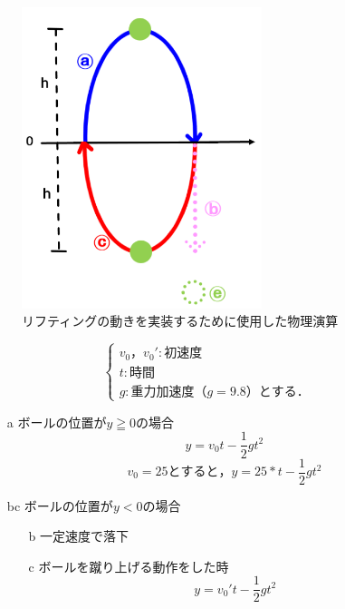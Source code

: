 \begin{figure}[htbp]
    \centering
    \includegraphics[width=7cm]{image/butsuri.png}
    \caption{リフティングの動きを実装するために使用した物理演算}
  \label{butsuri}
\end{figure}



\[
    \begin{cases}
        v_0，v_0': 初速度 & \\
        t: 時間 & \\
        g: 重力加速度（g=9.8）とする． &
    \end{cases}
\]

\vspace{1cm}

\begin{itemize}
    \item[a] ボールの位置が$y \geqq 0$の場合
        \begin{equation}
            y=v_0t-\frac{1}{2}gt^2
        \end{equation}
        \begin{equation}
            v_0=25とすると，y=25*t-\frac{1}{2}gt^2
        \end{equation}
        
    \item[bc] ボールの位置が$y < 0$の場合
        \begin{itemize}
            \item[b] 一定速度で落下
            \item[c] ボールを蹴り上げる動作をした時
                \begin{equation}
                    y=v_0't-\frac{1}{2}gt^2
                \end{equation}
        \end{itemize}
\end{itemize}

